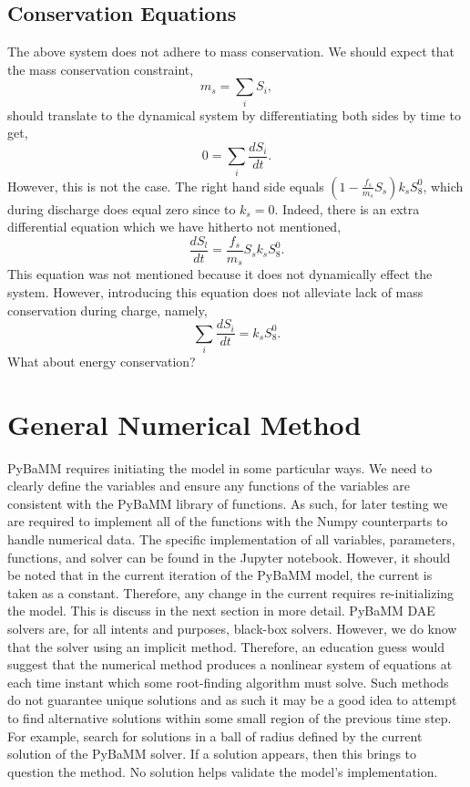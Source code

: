 \documentclass[11pt,twoside,a4paper]{article}
\begin{document}
\subsection{Conservation Equations}
The above system does not adhere to mass conservation. We should expect that the mass conservation constraint, 
%
\begin{equation}
m_s = \sum_i S_i,
\end{equation}
%
should translate to the dynamical system by differentiating both sides by time to get, 
%
\begin{equation}
0 = \sum_i \frac{dS_i}{dt}.
\end{equation}
%
However, this is not the case. The right hand side equals $\left(1-\frac{f_s}{m_s}S_s\right)k_sS_8^0$, which during discharge does equal zero since to $k_s=0$. Indeed, there is an extra differential equation which we have hitherto not mentioned, 
%
\begin{equation}
\frac{dS_l}{dt} = \frac{f_s}{m_s}S_sk_sS_8^0.
\end{equation}
%
This equation was not mentioned because it does not dynamically effect the system. However, introducing this equation does not alleviate lack of mass conservation during charge, namely, 
%
\begin{equation}
\sum_i \frac{dS_i}{dt} = k_sS_8^0.
\end{equation}
%
What about energy conservation? 

\section{General Numerical Method}
PyBaMM requires initiating the model in some particular ways. We need to clearly define the variables and ensure any functions of the variables are consistent with the PyBaMM library of functions. As such, for later testing we are required to implement all of the functions with the Numpy counterparts to handle numerical data. The specific implementation of all variables, parameters, functions, and solver can be found in the Jupyter notebook. However, it should be noted that in the current iteration of the PyBaMM model, the current is taken as a constant. Therefore, any change in the current requires re-initializing the model. This is discuss in the next section in more detail. PyBaMM DAE solvers are, for all intents and purposes, black-box solvers. However, we do know that the solver using an implicit method. Therefore, an education guess would suggest that the numerical method produces a nonlinear system of equations at each time instant which some root-finding algorithm must solve. Such methods do not guarantee unique solutions and as such it may be a good idea to attempt to find alternative solutions within some small region of the previous time step. For example, search for solutions in a ball of radius defined by the current solution of the PyBaMM solver. If a solution appears, then this brings to question the method. No solution helps validate the model's implementation. 
\end{document}
